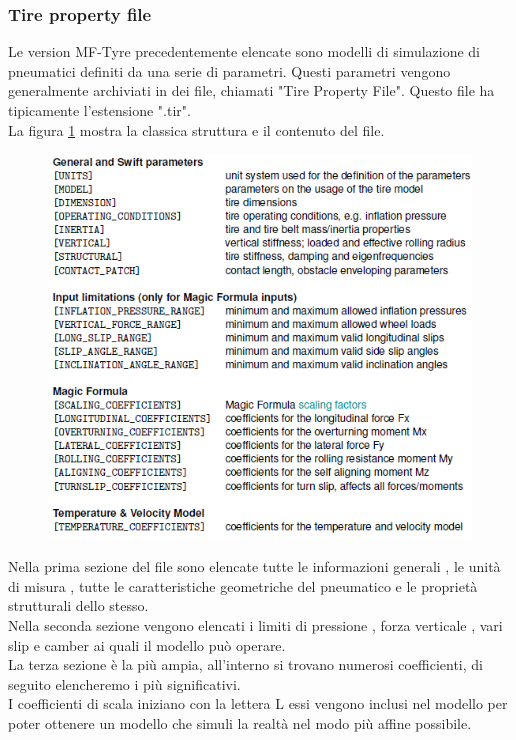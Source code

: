 \subsubsection{Tire property file}
Le version MF-Tyre precedentemente elencate sono modelli di simulazione di pneumatici definiti da una serie di parametri. Questi parametri vengono generalmente archiviati in dei file, chiamati "Tire Property File". Questo file ha tipicamente l'estensione ".tir".\\ 
La figura \ref{fig:Structure_file_tir} mostra la classica struttura e il contenuto del file.\\
\begin{figure}[ht]
    \centering
    \includegraphics[scale=0.9]{Immagini/Tyres/Structure_file_tir.png}
    \caption{}
    \label{fig:Structure_file_tir}
\end{figure}
Nella prima sezione del file sono elencate tutte le informazioni generali , le unità di misura , tutte le caratteristiche geometriche del pneumatico
e le proprietà strutturali dello stesso.\\
Nella seconda sezione vengono elencati i limiti di pressione , forza verticale , vari slip e camber ai quali il modello può operare.\\
La terza sezione è la più ampia, all'interno si trovano numerosi coefficienti, di seguito elencheremo i più significativi.\\
I coefficienti di scala iniziano con la lettera L essi vengono inclusi nel modello per poter ottenere un modello che simuli la realtà nel modo più affine possibile.
